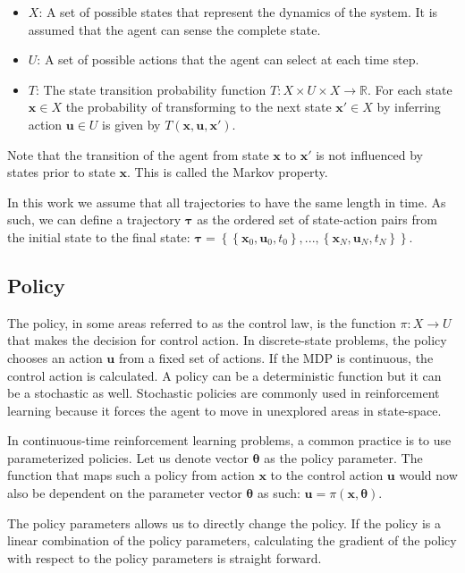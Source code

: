 \documentclass[mscThesis.tex]{subfiles}
\begin{document}
\begin{itemize}
\item $X$: A set of possible states that represent the dynamics of the system. It is assumed that the agent can sense the complete state.
\item $U$: A set of possible actions that the agent can select at each time step. 
\item $T$: The state transition probability function $T:X \times U \times X \rightarrow \mathbb{R}$. For each state $\bm{x} \in X$ the probability of transforming to the next state $\bm{x}' \in X$ by inferring action $\bm{u} \in U$ is given by $T(\bm{x},\bm{u},\bm{x}')$.
\end{itemize}

Note that the transition of the agent from state $\bm{x}$ to $\bm{x}'$ is not influenced by states prior to state $\bm{x}$. This is called the Markov property.

In this work we assume that all trajectories to have the same length in time. As such, we can define a trajectory $\bm{\tau}$ as the ordered set of state-action pairs from the initial state to the final state: $\bm{\tau} = \left\{ \left\{\bm{x}_0, \bm{u}_0, t_0 \right\}, ..., \left\{\bm{x}_N, \bm{u}_N, t_N \right\} \right\}$.

\subsection{Policy}
The policy, in some areas referred to as the control law, is the function $\pi:X \rightarrow U$ that makes the decision for control action. In discrete-state problems, the policy chooses an action $\bm{u}$ from a fixed set of actions. If the MDP is continuous, the control action is calculated. A policy can be a deterministic function but it can be a stochastic as well. Stochastic policies are commonly used in reinforcement learning because it forces the agent to move in unexplored areas in state-space. 

In continuous-time reinforcement learning problems, a common practice is to use parameterized policies. Let us denote vector $\bm{\theta}$ as the policy parameter. The function that maps such a policy from action $\bm{x}$ to the control action $\bm{u}$ would now also be dependent on the parameter vector $\bm{\theta}$ as such: $\bm{u} = \pi (\bm{x}, \bm{\theta})$.

The policy parameters allows us to directly change the policy. If the policy is a linear combination of the policy parameters, calculating the gradient of the policy with respect to the policy parameters is straight forward.     
\end{document}
